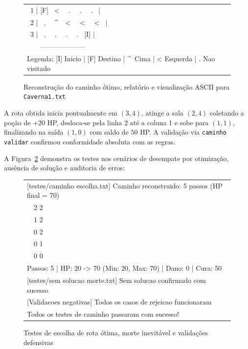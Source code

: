 \documentclass[12pt,a4paper]{article}
\makeatletter
\DeclareRobustCommand{\_}{%
  \ifmmode
    \nfss@text{\textunderscore}%
  \else
    \textunderscore\allowbreak
  \fi
}
\makeatother
\begin{document}
\begin{figure}[htbp]
\begin{minipage}{0.85\textwidth}
\begin{tabular}{|l|}
        \ 1 | [F] \ < \ \ . \ \ . \ \ . \ | \\
        \ 2 | \ . \ \ \textasciicircum \ \ < \ \ < \ \ < \ | \\
        \ 3 | \ . \ \ . \ \ . \ \ . \ [I] | \\
        \ \ \ \ -------------------- \\
        Legenda: [I] Inicio | [F] Destino | \textasciicircum\ Cima | < Esquerda | . Nao visitado \\
        \hline
        \end{tabular}
    \end{minipage}
    \vspace{0.2cm}
    \caption{Reconstrução do caminho ótimo, relatório e visualização ASCII para \texttt{Caverna1.txt}}
    \label{fig:teste_caminho_ok}
\end{figure}

A rota obtida inicia pontualmente em $(3,4)$, atinge a sala $(2,4)$ coletando a poção de $+20$ HP, desloca-se pela linha 2 até a coluna 1 e sobe para $(1,1)$, finalizando na saída $(1,0)$ com saldo de $50$ HP. A validação via \texttt{caminho\_validar} confirmou conformidade absoluta com as regras.

A Figura~\ref{fig:teste_caminho_extras} demonstra os testes nos cenários de desempate por otimização, ausência de solução e auditoria de erros:

\begin{figure}[htbp]
    \centering
    \begin{minipage}{0.85\textwidth}
        \ttfamily\small
        \begin{tabular}{|l|}
        \hline
        {[testes/caminho\_escolha.txt]} Caminho reconstruido: 5 passos (HP final = 70) \\
        \ \ 2 2 \\
        \ \ 1 2 \\
        \ \ 0 2 \\
        \ \ 0 1 \\
        \ \ 0 0 \\
        Passos: 5 | HP: 20 -> 70 (Min: 20, Max: 70) | Dano: 0 | Cura: 50 \\[0.15cm]
        {[testes/sem\_solucao\_morte.txt]} Sem solucao confirmado com sucesso \\[0.15cm]
        {[Validacoes negativas]} Todos os casos de rejeicao funcionaram \\
        Todos os testes de caminho passaram com sucesso! \\
        \hline
        \end{tabular}
    \end{minipage}
    \vspace{0.2cm}
    \caption{Testes de escolha de rota ótima, morte inevitável e validações defensivas}
    \label{fig:teste_caminho_extras}
\end{figure}
\end{document}
